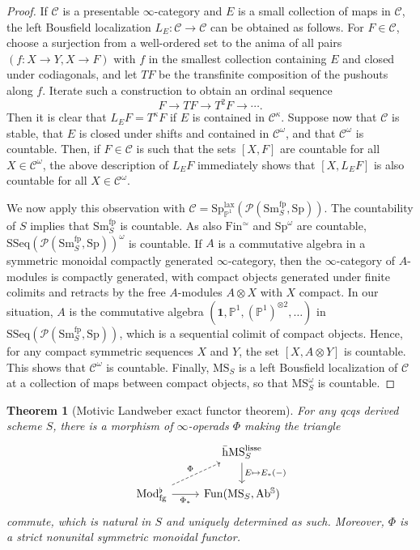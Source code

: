 \documentclass{amsart}
\numberwithin{equation}{section}
\theoremstyle{plain}
\newtheorem{theorem}[equation]{Theorem}
\theoremstyle{definition}
\let\scr=\mathcal
\let\bb=\mathbb
\def\P{\bb P}
\def\1{\mathbf 1}
\def\ph{\mathord-}
\def\SSeq{\mathrm{SSeq}}
\let\cat=\mathrm
\def\Mod{\cat{M}\mathrm{od}{}}
\def\Sm{{\cat{S}\mathrm{m}}}
\def\Fin{\cat F\mathrm{in}}
\def\MS{\mathrm{MS}}
\def\Sp{\mathrm{Sp}}
\def\Ab{\mathrm{A}\mathrm{b}}
\def\fp{\mathrm{fp}}
\def\Fun{\mathrm{Fun}}
\def\w{\bar{\mathrm{h}}}
\def\fg{\mathrm{fg}}
\def\lisse{\mathrm{lisse}}
\begin{document}
\begin{proof}
	If $\scr C$ is a presentable $\infty$-category and $E$ is a small collection of maps in $\scr C$, the left Bousfield localization $L_E\colon\scr C\to\scr C$ can be obtained as follows. For $F\in\scr C$, choose a surjection from a well-ordered set to the anima of all pairs $(f\colon X\to Y,X \to F)$ with $f$ in the smallest collection containing $E$ and closed under codiagonals, and let $TF$ be the transfinite composition of the pushouts along $f$. Iterate such a construction to obtain an ordinal sequence
	\[
	F\to TF\to T^2F\to\dotsb.
	\]
	Then it is clear that $L_EF=T^\kappa F$ if $E$ is contained in $\scr C^\kappa$.
	Suppose now that $\scr C$ is stable, that $E$ is closed under shifts and contained in $\scr C^\omega$, and that $\scr C^\omega$ is countable. 
	Then, if $F\in\scr C$ is such that the sets $[X,F]$ are countable for all $X\in\scr C^\omega$, the above description of $L_EF$ immediately shows that $[X,L_EF]$ is also countable for all $X\in\scr C^\omega$.

	We now apply this observation with $\scr C=\Sp_{\P^1}^\mathrm{lax}(\scr P(\Sm_S^\fp,\Sp))$. 
	The countability of $S$ implies that $\Sm_S^\fp$ is countable. As also $\Fin^\simeq$ and $\Sp^\omega$ are countable, $\SSeq(\scr P(\Sm_S^\fp,\Sp))^\omega$ is countable. If $A$ is a commutative algebra in a symmetric monoidal compactly generated $\infty$-category, then the $\infty$-category of $A$-modules is compactly generated, with compact objects generated under finite colimits and retracts by the free $A$-modules $A\otimes X$ with $X$ compact.
	In our situation, $A$ is the commutative algebra $(\1,\P^1,(\P^1)^{\otimes 2},\dotsc)$ in $\SSeq(\scr P(\Sm_S^\fp,\Sp))$, which is a sequential colimit of compact objects. Hence, for any compact symmetric sequences $X$ and $Y$, the set $[X,A\otimes Y]$ is countable. This shows that $\scr C^\omega$ is countable. Finally, $\MS_S$ is a left Bousfield localization of $\scr C$ at a collection of maps between compact objects, so that $\MS_S^\omega$ is countable.
\end{proof}

\begin{theorem}[Motivic Landweber exact functor theorem]
	\label{thm:LEFT}
	For any qcqs derived scheme $S$, there is a morphism of $\infty$-operads $\Phi$ making the triangle
	\[
	\begin{tikzcd}
		& \w\MS_S^\lisse \ar{d}{E\mapsto E_*(\ph)} \\
		\Mod_\fg^\flat \ar{r}[swap]{\Phi_*} \ar[dashed]{ur}{\Phi} & \Fun(\MS_S,\Ab^\bb S)
	\end{tikzcd}
	\]
	commute, which is natural in $S$ and uniquely determined as such. Moreover, $\Phi$ is a strict nonunital symmetric monoidal functor.
\end{theorem}
\end{document}
